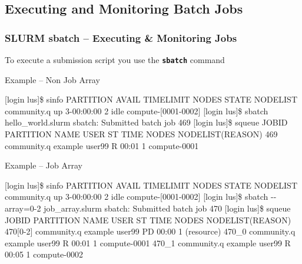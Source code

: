 \documentclass[t,hyperref={pdfpagelabels=false}]{beamer}
\newcommand{\ddash}{-{}-}
\begin{document}
\subsection{Executing and Monitoring Batch Jobs}
\begin{frame}[fragile]
\frametitle{SLURM sbatch -- Executing \& Monitoring Jobs}\footnotesize
To execute a submission script you use the \textbf{\texttt{sbatch}} command
\begin{block}{Example -- Non Job Array}
\begin{semiverbatim}\tiny
[login lus]\$ sinfo
PARTITION     AVAIL  TIMELIMIT  NODES  STATE NODELIST
community.q   up     3-00:00:00 2      idle  compute-[0001-0002]
[login lus]\$ sbatch hello_world.slurm
sbatch: Submitted batch job 469
[login lus]\$ squeue
JOBID PARTITION    NAME     USER    ST TIME  NODES  NODELIST(REASON)
469   community.q  example  user99  R  00:01 1      compute-0001
\end{semiverbatim}
\end{block}
\begin{block}{Example -- Job Array}
\begin{semiverbatim}\tiny
[login lus]\$ sinfo
PARTITION     AVAIL  TIMELIMIT  NODES  STATE NODELIST
community.q   up     3-00:00:00 2      idle  compute-[0001-0002]
[login lus]\$ sbatch {\ddash}array=0-2 job_array.slurm
sbatch: Submitted batch job 470
[login lus]\$ squeue
JOBID     PARTITION    NAME     USER    ST   TIME    NODES  NODELIST(REASON)
470[0-2]  community.q  example  user99  PD   00:00   1      (resource)
470_0     community.q  example  user99  R    00:01   1      compute-0001
470_1     community.q  example  user99  R    00:05   1      compute-0002
\end{semiverbatim}
\end{block}


\end{frame}
\end{document}
